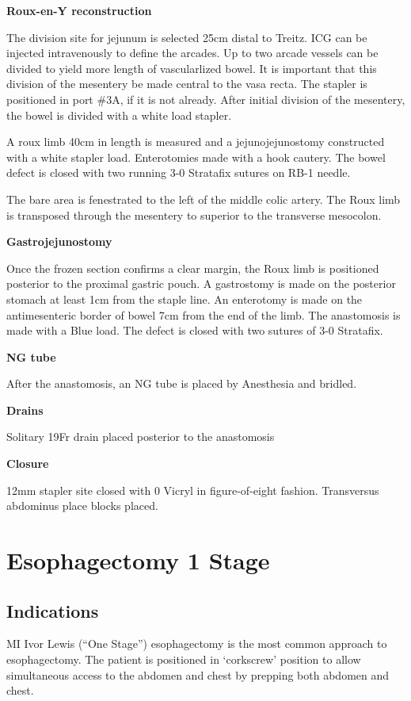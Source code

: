 \documentclass[
  letterpaper,
]{scrbook}
\begin{document}
\textbf{Roux-en-Y reconstruction}

The division site for jejunum is selected 25cm distal to Treitz. ICG can
be injected intravenously to define the arcades. Up to two arcade
vessels can be divided to yield more length of vascularlized bowel. It
is important that this division of the mesentery be made central to the
vasa recta. The stapler is positioned in port \#3A, if it is not
already. After initial division of the mesentery, the bowel is divided
with a white load stapler.

A roux limb 40cm in length is measured and a jejunojejunostomy
constructed with a white stapler load. Enterotomies made with a hook
cautery. The bowel defect is closed with two running 3-0 Stratafix
sutures on RB-1 needle.

The bare area is fenestrated to the left of the middle colic artery. The
Roux limb is transposed through the mesentery to superior to the
transverse mesocolon.

\textbf{Gastrojejunostomy}

Once the frozen section confirms a clear margin, the Roux limb is
positioned posterior to the proximal gastric pouch. A gastrostomy is
made on the posterior stomach at least 1cm from the staple line. An
enterotomy is made on the antimesenteric border of bowel 7cm from the
end of the limb. The anastomosis is made with a Blue load. The defect is
closed with two sutures of 3-0 Stratafix.

\textbf{NG tube}

After the anastomosis, an NG tube is placed by Anesthesia and bridled.

\textbf{Drains}

Solitary 19Fr drain placed posterior to the anastomosis

\textbf{Closure}

12mm stapler site closed with 0 Vicryl in figure-of-eight fashion.
Transversus abdominus place blocks placed.

\chapter{Esophagectomy 1 Stage}\label{esophagectomy-1-stage}

\section{Indications}\label{indications}

MI Ivor Lewis (``One Stage'') esophagectomy is the most common approach
to esophagectomy. The patient is positioned in `corkscrew' position to
allow simultaneous access to the abdomen and chest by prepping both
abdomen and chest.
\end{document}
